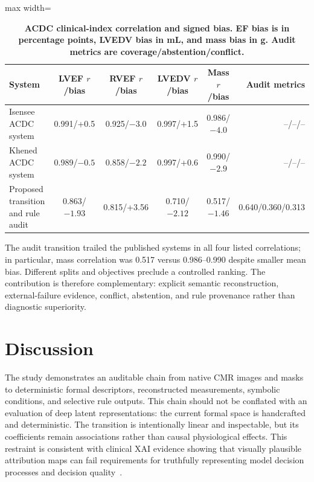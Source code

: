 \documentclass{ceurart}
\begin{document}
\begin{table}[!htbp]
\caption{\textbf{ACDC clinical-index correlation and signed bias. EF bias is in percentage points, LVEDV bias in mL, and mass bias in g. Audit metrics are coverage/abstention/conflict.}}
\label{tab:acdc_correlation_bias}
\centering
\begin{adjustbox}{max width=\linewidth}
\begin{tabular}{lccccr}
\toprule
System & LVEF \(r\)/bias & RVEF \(r\)/bias & LVEDV \(r\)/bias & Mass \(r\)/bias & Audit metrics \\
\midrule
Isensee ACDC system & 0.991/+0.5 & 0.925/$-3.0$ & 0.997/+1.5 & 0.986/$-4.0$ & --/--/-- \\
Khened ACDC system & 0.989/$-0.5$ & 0.858/$-2.2$ & 0.997/+0.6 & 0.990/$-2.9$ & --/--/-- \\
Proposed transition and rule audit & 0.863/$-1.93$ & 0.815/+3.56 & 0.710/$-2.12$ & 0.517/$-1.46$ & 0.640/0.360/0.313 \\
\bottomrule
\end{tabular}
\end{adjustbox}
\end{table}

The audit transition trailed the published systems in all four listed correlations; in particular, mass correlation was 0.517 versus 0.986--0.990 despite smaller mean bias. Different splits and objectives preclude a controlled ranking. The contribution is therefore complementary: explicit semantic reconstruction, external-failure evidence, conflict, abstention, and rule provenance rather than diagnostic superiority.

\section{Discussion}\label{sec:discussion}

The study demonstrates an auditable chain from native CMR images and masks to deterministic formal descriptors, reconstructed measurements, symbolic conditions, and selective rule outputs. This chain should not be conflated with an evaluation of deep latent representations: the current formal space is handcrafted and deterministic. The transition is intentionally linear and inspectable, but its coefficients remain associations rather than causal physiological effects. This restraint is consistent with clinical XAI evidence showing that visually plausible attribution maps can fail requirements for truthfully representing model decision processes and decision quality~\cite{Jin2022MultimodalXAI}.
\end{document}
